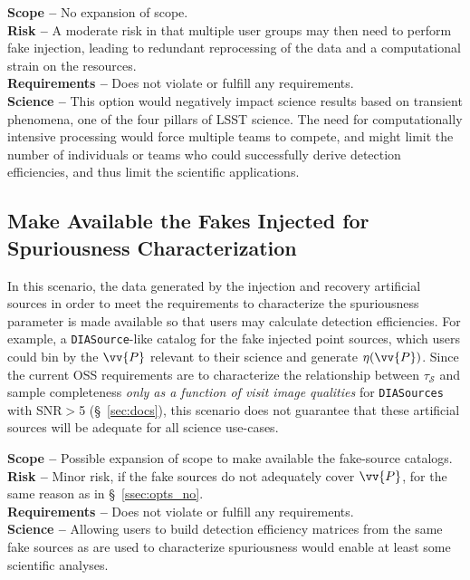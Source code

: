\documentclass[DM,lsstdraft,toc]{lsstdoc}
\begin{document}
{\bf Scope --} No expansion of scope. \\
{\bf Risk --} A moderate risk in that multiple user groups may then need to perform fake injection, leading to redundant reprocessing of the data and a computational strain on the resources. \\
{\bf Requirements --} Does not violate or fulfill any requirements. \\
{\bf Science --} This option would negatively impact science results based on transient phenomena, one of the four pillars of LSST science. The need for computationally intensive processing would force multiple teams to compete, and might limit the number of individuals or teams who could successfully derive detection efficiencies, and thus limit the scientific applications.

\subsection{Make Available the Fakes Injected for Spuriousness Characterization}\label{ssec:opts_makefakeavail}

In this scenario, the data generated by the injection and recovery artificial sources in order to meet the requirements to characterize the spuriousness parameter is made available so that users may calculate detection efficiencies. For example, a {\tt DIASource}-like catalog for the fake injected point sources, which users could bin by the $\vv{P}$ relevant to their science and generate $\eta(\vv{P})$. Since the current OSS requirements are to characterize the relationship between $\tau_{\mathcal{S}}$ and sample completeness {\it only as a function of visit image qualities} for {\tt DIASources} with SNR$>$5 (\S~\ref{sec:docs}), this scenario does not guarantee that these artificial sources will be adequate for all science use-cases. 

{\bf Scope --} Possible expansion of scope to make available the fake-source catalogs. \\
{\bf Risk --} Minor risk, if the fake sources do not adequately cover $\vv{P}$, for the same reason as in \S~\ref{ssec:opts_no}. \\
{\bf Requirements --} Does not violate or fulfill any requirements. \\
{\bf Science --} Allowing users to build detection efficiency matrices from the same fake sources as are used to characterize spuriousness would enable at least some scientific analyses.
\end{document}
